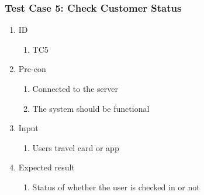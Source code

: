 \subsubsection*{Test Case 5: Check Customer Status}
\begin{enumerate}
	\item ID
		\begin{enumerate}
			\item TC5
		\end{enumerate}
	\item Pre-con
		\begin{enumerate}
			\item Connected to the server
			\item The system should be functional
		\end{enumerate}
	\item Input
		\begin{enumerate}
			\item Users travel card or app
		\end{enumerate}
	\item Expected result
		\begin{enumerate}
			\item Status of whether the user is checked in or not
		\end{enumerate}
\end{enumerate}
